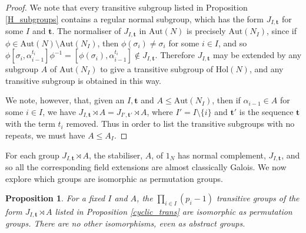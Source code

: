 \documentclass[a4paper,reqno]{amsart}
\newtheorem{proposition}[theorem]{Proposition}
\theoremstyle{definition}
\newcommand{\bt}{\textbf{t}}
\newcommand{\Aut}{\mathrm{Aut}}
\newcommand{\Hol}{\mathrm{Hol}}
\begin{document}
\begin{proof}
    We note that every transitive subgroup listed in Proposition \ref{H_subgroups} contains a regular normal subgroup, which has the form $J_{I,\bt}$ for some $I$ and $\bt$. The normaliser of $J_{I,\bt}$ in $\Aut(N)$ is precisely $\Aut(N_I)$, since if $\phi \in \Aut(N)\setminus \Aut(N_I)$, then $\phi(\sigma_i)\neq \sigma_i$ for some $i \in I$, and so $\phi \left[\sigma_i,\alpha_{i-1}^{t_i}\right]\phi^{-1}=\left[\phi(\sigma_i),\alpha_{i-1}^{t_i}\right]\notin J_{I,\bt}$. Therefore $J_{I,\bt}$ may be extended by any subgroup $A$ of $\Aut(N_I)$ to give a transitive subgroup of $\Hol(N)$, and any transitive subgroup is obtained in this way.

    We note, however, that, given an $I,\bt$ and $A \leq \Aut(N_I)$, then if $\alpha_{i-1} \in A$ for some $i \in I$, we have $J_{I,\bt} \rtimes A = J_{I',\bt'} \rtimes A$, where $I'=I\setminus\{i\}$ and $\bt'$ is the sequence $\bt$ with the term $t_i$ removed. Thus in order to list the transitive subgroups with no repeats, we must have $A \leq A_I$.
\end{proof}
    For each group $J_{I,\bt} \rtimes A$, the stabiliser, $A$, of $1_N$ has normal complement, $J_{I,\bt}$, and so all the corresponding field extensions are almost classically Galois. We now explore which groups are isomorphic as permutation groups.

\begin{proposition}\label{cyclic_isoms_cunningham}
    For a fixed $I$ and $A$, the $\prod_{i \in I}(p_i-1)$ transitive groups of the form $J_{I,\bt} \rtimes A$ listed in Proposition \ref{cyclic_trans} are isomorphic as permutation groups. There are no other isomorphisms, even as abstract groups.
\end{proposition}
\end{document}
